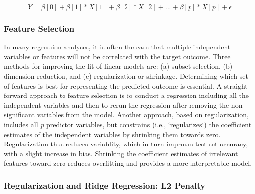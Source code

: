 \documentclass[sigconf]{acmart}
\begin{document}
\begin{equation}
  \ Y = \beta[0] + \beta[1]*X[1] + \beta[2]*X[2] +... + \beta[p]*X[p] + \epsilon
\end{equation}


\subsubsection{Feature Selection} 

In many regression analyses, it is often the case that multiple independent 
variables or features will not be correlated with the target outcome. Three 
methods for improving the fit of linear models are: (a) subset selection, 
(b) dimension reduction, and (c) regularization or shrinkage. Determining 
which set of features is best for representing the predicted outcome is 
essential. A straight forward approach to feature selection is to conduct a 
regression including all the independent variables and then to rerun the 
regression after removing the non-significant variables from the model.
Another approach, based on regularization, includes all \textit{p} predictor 
variables, but constrains (i.e., `regularizes`) the coefficient estimates of 
the independent variables by shrinking them towards zero. Regularization thus 
reduces variablity, which in turn improves test set accuracy, with a slight 
increase in bias. Shrinking the coefficient estimates of irrelevant features 
toward zero reduces overfitting and provides a more interpretable model. 


\subsubsection{Regularization and Ridge Regression: L2 Penalty} 
\end{document}
